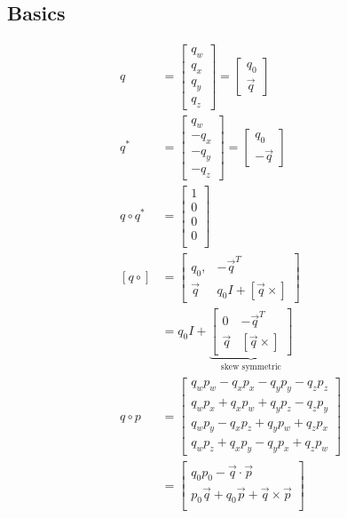 \documentclass[11pt]{article}
\begin{document}
\subsection{Basics}
\begin{align}
	q &=
	\begin{bmatrix}
			q_w\\
			q_x\\
			q_y\\
			q_z
	\end{bmatrix}
	=
	\begin{bmatrix}
	q_0\\
	\vec q
	\end{bmatrix}\\
 	q^* &=
	\begin{bmatrix}
			q_w\\
			-q_x\\
			-q_y\\
			-q_z
	\end{bmatrix}
	=
	\begin{bmatrix}
		q_0\\
		-\vec q
	\end{bmatrix}\\
 	q \circ q^* &=
	\begin{bmatrix}
		1\\
		0\\
		0\\
		0\\
	\end{bmatrix}\\
 	[q \circ] &=
	\begin{bmatrix}
		q_0, & -\vec q^T\\
		\vec q & q_0I + [\vec q\times] 
	\end{bmatrix}\\
	&= q_0I +
	\underbrace{\begin{bmatrix}
	0 & -\vec q^T\\
 	\vec q & [\vec q \times]
	\end{bmatrix}}_{\text{skew symmetric}}\\
	q \circ p &=
	\begin{bmatrix}
		q_wp_w - q_xp_x - q_yp_y - q_zp_z\\
		q_wp_x + q_xp_w + q_yp_z - q_zp_y\\
		q_wp_y - q_xp_z + q_yp_w + q_zp_x\\
		q_wp_z + q_xp_y - q_yp_x + q_zp_w
	\end{bmatrix}\\
	&=
	\begin{bmatrix}
		q_0p_0 - \vec q \cdot \vec p\\
		p_0\vec q + q_0 \vec p + \vec q \times \vec p\\
	\end{bmatrix}
\end{align}
	
\end{document}
